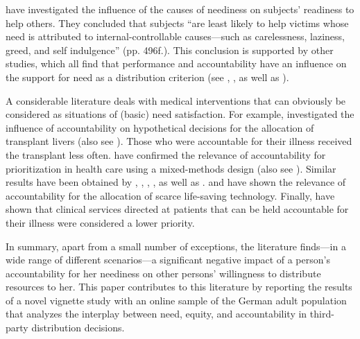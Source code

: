 \documentclass[smallcondensed]{svjour3}
\begin{document}
%
\citet{skitka_allocating_1992} have investigated the influence of the causes of neediness on subjects' readiness to help others. They concluded that subjects ``are least likely to help victims whose need is attributed to internal-controllable causes---such as carelessness, laziness, greed, and self indulgence'' (pp. 496f.). This conclusion is supported by other studies, which all find that performance and accountability have an influence on the support for need as a distribution criterion (see \citealt{wagstaff_equity_1994}, \citealt{farwell_self-perception_1996}, as well as \citealt{scott_whats_2009}).\par
%
A considerable literature deals with medical interventions that can obviously be considered as situations of (basic) need satisfaction. For example, \citet{ubel_allocation_2001} investigated the influence of accountability on hypothetical decisions for the allocation of transplant livers (also see \citealt{neuberger_assessing_1998}). Those who were accountable for their illness received the transplant less often. \citet{diederich_zur_2010} have confirmed the relevance of accountability for prioritization in health care using a mixed-methods design (also see \citealt{diederich_does_2014}). Similar results have been obtained by \citet{betancourt_attribution-empathy_1990}, \citet{karasawa_effects_1991}, \citet{murphy-berman_factors_1984}, \citet{turner_depalma_perceived_1999}, as well as \citet{yamauchi_attribution-emotion_1999}. \citet{annas_prostitute_1985} and \citet{stanton_cost_1999} have shown the relevance of accountability for the allocation of scarce life-saving technology. Finally, \citet{fowler_measuring_1994} have shown that clinical services directed at patients that can be held accountable for their illness were considered a lower priority.\par
%
In summary, apart from a small number of exceptions, the literature finds---in a wide range of different scenarios---a significant negative impact of a person's accountability for her neediness on other persons' willingness to distribute resources to her. This paper contributes to this literature by reporting the results of a novel vignette study with an online sample of the German adult population that analyzes the interplay between need, equity, and accountability in third-party distribution decisions.\par
%
\end{document}

